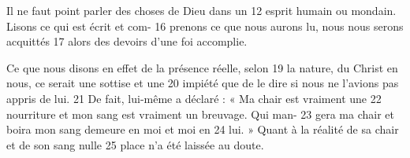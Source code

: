  Il ne faut point parler des choses de Dieu dans un	 
12	 	esprit humain ou mondain. Lisons ce qui est écrit et com-	 
16	 	prenons ce que nous aurons lu, nous nous serons acquittés	 
17	 	alors des devoirs d'une foi accomplie.

	Ce que nous disons en effet de la présence réelle, selon	 
19	 	la nature, du Christ en nous, ce serait une sottise et une	 
20	 	impiété que de le dire si nous ne l'avions pas appris de lui.	 
21	 	De fait, lui-même a déclaré : « Ma chair est vraiment une	 
22	 	nourriture et mon sang est vraiment un breuvage. Qui man-	 
23	 	gera ma chair et boira mon sang demeure en moi et moi en	 
24	 	lui. » Quant à la réalité de sa chair et de son sang nulle	 
25	 	place n'a été laissée au doute.